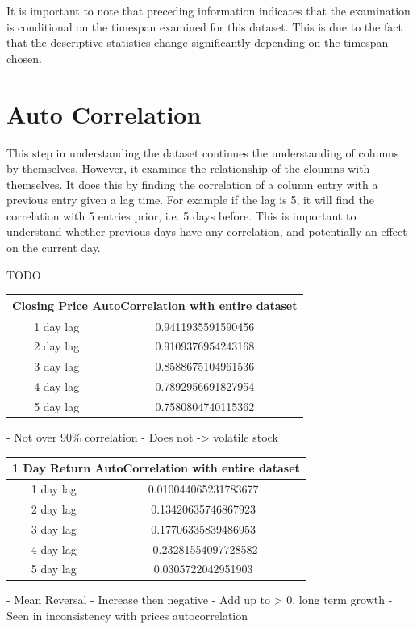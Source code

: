 It is important to note that preceding information indicates that the examination is conditional on the timespan examined for this dataset. This is due to the fact that the descriptive statistics change significantly depending on the timespan chosen.

\section{Auto Correlation}

This step in understanding the dataset continues the understanding of columns by themselves. However, it examines the relationship of the cloumns with themselves. It does this by finding the correlation of a column entry with a previous entry given a lag time. For example if the lag is 5, it will find the correlation with 5 entries prior, i.e. 5 days before. This is important to understand whether previous days have any correlation, and potentially an effect on the current day.

TODO
\begin{center}
\begin{tabular}{ c c }
\hline
\multicolumn{2}{|c|}{Closing Price AutoCorrelation with entire dataset} \\
\hline
1 day lag & 0.9411935591590456 \\
2 day lag & 0.9109376954243168 \\
3 day lag & 0.8588675104961536 \\
4 day lag & 0.7892956691827954 \\
5 day lag & 0.7580804740115362
\end{tabular}
\end{center}

- Not over 90\% correlation
- Does not -> volatile stock

\begin{center}
\begin{tabular}{ c c }
\hline
\multicolumn{2}{|c|}{1 Day Return AutoCorrelation with entire dataset} \\
\hline
1 day lag & 0.010044065231783677 \\
2 day lag & 0.13420635746867923 \\
3 day lag & 0.17706335839486953 \\
4 day lag & -0.23281554097728582 \\
5 day lag & 0.0305722042951903
\end{tabular}
\end{center}

- Mean Reversal
    - Increase then negative
- Add up to > 0, long term growth
    - Seen in inconsistency with prices autocorrelation

